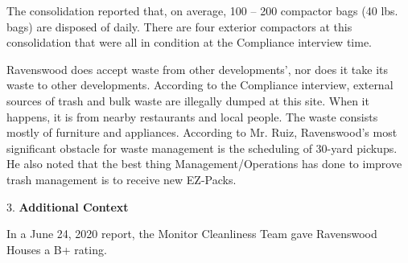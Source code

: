 The consolidation reported that, on average, 100 -- 200 compactor bags (40 lbs. bags) are disposed of daily. There are four exterior compactors at this consolidation that were all in condition at the Compliance interview time.  

Ravenswood does accept waste from other developments', nor does it take its waste to other developments.  According to the Compliance interview, external sources of trash and bulk waste are illegally dumped at this site. When it happens, it is from nearby restaurants and local people. The waste consists mostly of furniture and appliances. According to Mr. Ruiz, Ravenswood's most significant obstacle for waste management is the scheduling of 30-yard pickups. He also noted that the best thing Management/Operations has done to improve trash management is to receive new EZ-Packs.

3. \textbf{Additional Context}

In a June 24, 2020 report, the Monitor Cleanliness Team gave Ravenswood Houses a B+ rating.